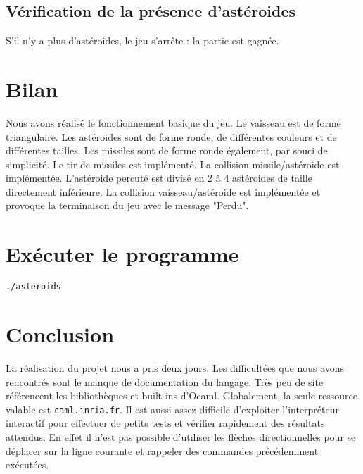 \documentclass[a4paper,10pt,openany,oneside]{report}
\begin{document}
\subsection{Vérification de la présence d'astéroides}

S'il n'y a plus d'astéroides, le jeu s'arrête : la partie est gagnée.

\section{Bilan}

Nous avons réalisé le fonctionnement basique du jeu. Le vaisseau est de forme
triangulaire. Les astéroides sont de forme ronde, de différentes couleurs et de
différentes tailles. Les missiles sont de forme ronde également, par souci de
simplicité. Le tir de missiles est implémenté. La collision missile/astéroide
est implémentée. L'astéroide percuté est divisé en 2 à 4 astéroides de taille
directement inférieure. La collision vaisseau/astéroide est implémentée et
provoque la terminaison du jeu avec le message "Perdu".

\section{Exécuter le programme}

\texttt{./asteroids}

\section{Conclusion}

La réalisation du projet nous a pris deux jours. Les difficultées que nous
avons rencontrés sont le manque de documentation du langage. Très peu de site
référencent les bibliothèques et built-ins d'Ocaml. Globalement, la seule
ressource valable est \texttt{caml.inria.fr}. Il est aussi assez difficile
d'exploiter l'interpréteur interactif pour effectuer de petits tests et
vérifier rapidement des résultats attendus. En effet il n'est pas possible
d'utiliser les flèches directionnelles pour se déplacer sur la ligne courante
et rappeler des commandes précédemment exécutées.
\end{document}

